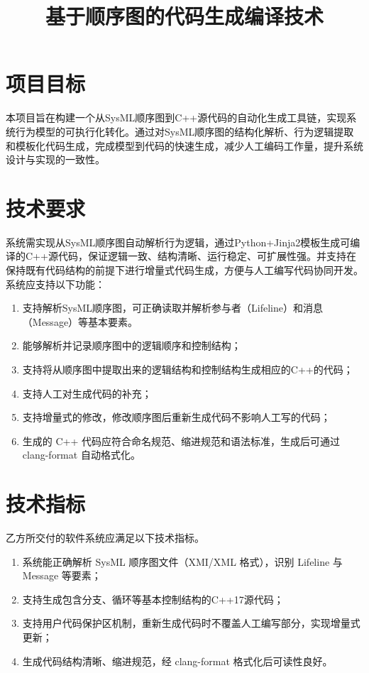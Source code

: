 \documentclass[hyperref,a4paper,UTF8, 12pt]{ctexart}
\title{基于顺序图的代码生成编译技术}
\date{}
\begin{document}
\maketitle

\section{项目目标}
本项目旨在构建一个从SysML顺序图到C++源代码的自动化生成工具链，实现系统行为模型的可执行化转化。通过对SysML顺序图的结构化解析、行为逻辑提取和模板化代码生成，完成模型到代码的快速生成，减少人工编码工作量，提升系统设计与实现的一致性。

\section{技术要求}

系统需实现从SysML顺序图自动解析行为逻辑，通过Python+Jinja2模板生成可编译的C++源代码，保证逻辑一致、结构清晰、运行稳定、可扩展性强。并支持在保持既有代码结构的前提下进行增量式代码生成，方便与人工编写代码协同开发。系统应支持以下功能：
  \begin{enumerate}
    \item 支持解析SysML顺序图，可正确读取并解析参与者（Lifeline）和消息（Message）等基本要素。
    \item 能够解析并记录顺序图中的逻辑顺序和控制结构；
    \item 支持将从顺序图中提取出来的逻辑结构和控制结构生成相应的C++的代码；
    \item 支持人工对生成代码的补充；
    \item 支持增量式的修改，修改顺序图后重新生成代码不影响人工写的代码；
    \item 生成的 C++ 代码应符合命名规范、缩进规范和语法标准，生成后可通过 clang-format 自动格式化。
  \end{enumerate}

\section{技术指标}

乙方所交付的软件系统应满足以下技术指标。

\begin{enumerate}
  \item 系统能正确解析 SysML 顺序图文件（XMI/XML 格式），识别 Lifeline 与 Message 等要素；
  \item 支持生成包含分支、循环等基本控制结构的C++17源代码；
  \item 支持用户代码保护区机制，重新生成代码时不覆盖人工编写部分，实现增量式更新；
  \item 生成代码结构清晰、缩进规范，经 clang-format 格式化后可读性良好。
\end{enumerate}
\end{document}

